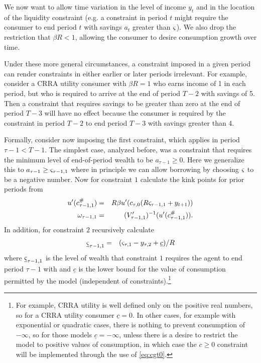 We now want to allow time variation in the level of income ${y}_{t}$ and in the location of the liquidity constraint (e.g$.$ a constraint in period $t$ might require the consumer to end period $t$ with savings ${a}_{t}$ greater than $\varsigma$).  We also drop the restriction that $\beta R < 1$, allowing the consumer to desire consumption growth over time.

Under these more general circumstances, a constraint imposed in a given period can render constraints in either earlier or later periods irrelevant.  For example, consider a CRRA utility consumer with $\beta R=1$ who earns income of 1 in each period, but who is required to arrive at the end of period $T-2$ with savings of 5.  Then a constraint that requires savings to be greater than zero at the end of period $T-3$ will have no effect because the consumer is required by the constraint in period $T-2$ to end period $T-3$ with savings greater than 4.

Formally, consider now imposing the first constraint, which applies in period $\tau-1 < T-1$.  The simplest case, analyzed before, was a constraint that requires the minimum level of end-of-period wealth to be ${a}_{\tau-1} \geq 0$.  Here we generalize this to ${a}_{\tau-1} \geq \varsigma_{\tau-1,1}$ where in principle we can allow borrowing by choosing $\varsigma$ to be a negative number. Now for constraint $1$ calculate the kink points for prior periods from
\begin{eqnarray}
  u'(c_{\tau-1,1}^{\#}) & = & R\beta u'(c_{\tau,0}(R\varsigma_{\tau-1,1}+{y}_{t+1}))
\\ \omega_{\tau-1,1} & = & (V_{\tau-1,1}')^{-1}(u'(c_{\tau-1,1}^{\#})).
\end{eqnarray}
In addition, for constraint $2$ recursively calculate
\begin{eqnarray}
\underline{\varsigma}_{\tau-1,1} & = & (\varsigma_{\tau,1}-{y}_{\tau,2}+\underline{c})/R  \label{eq:cgt0}
\end{eqnarray}
where $\underline{\varsigma}_{\tau-1,1}$ is the level of wealth that constraint $1$ requires the agent to end period $\tau-1$ with and $\underline{c}$ is the lower bound for the value of consumption permitted by the model (independent of constraints).\footnote{For example, CRRA utility is well defined only on the positive real numbers, so for a CRRA utility consumer $\underline{c}=0$.  In other cases, for example with exponential or quadratic cases, there is nothing to prevent consumption of $-\infty$, so for those models $\underline{c}=-\infty$, unless there is a desire to restrict the model to positive values of consumption, in which case the $c\geq 0$ constraint will be implemented through the use of \eqref{eq:cgt0}.}

